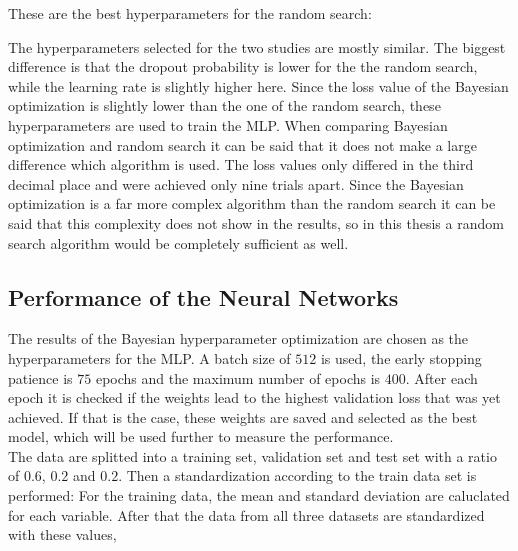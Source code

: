 These are the best hyperparameters for the random search:


The hyperparameters selected for the two studies are mostly similar. The biggest difference is that the dropout probability is lower for the the random search, while the learning rate is slightly higher here. 
Since the loss value of the Bayesian optimization is slightly lower than the one of the random search, these hyperparameters are used to train the MLP.
When comparing Bayesian optimization and random search it can be said that it does not make a large difference which algorithm is used. The loss values only differed in the third decimal place
and were achieved only nine trials apart. Since the Bayesian optimization is a far more complex algorithm than the random search it can be said that this complexity does not show in the results,
so in this thesis a random search algorithm would be completely sufficient as well.

\subsection{Performance of the Neural Networks}
\label{subsec:perfgat}

The results of the Bayesian hyperparameter optimization are chosen as the hyperparameters for the MLP. A batch size of $512$ is used, the early stopping patience is $75$ epochs and the maximum
number of epochs is $400$. After each epoch it is checked if the weights lead to the highest validation loss that was yet achieved. If that is the case, these weights are saved and selected as the best model,
which will be used further to measure the performance. \\

The data are splitted into a training set, validation set and test set with a ratio of $0.6$, $0.2$ and $0.2$. Then a standardization according to the train data set is performed: For the training data,
the mean and standard deviation are caluclated for each variable. After that the data from all three datasets are standardized with these values,

